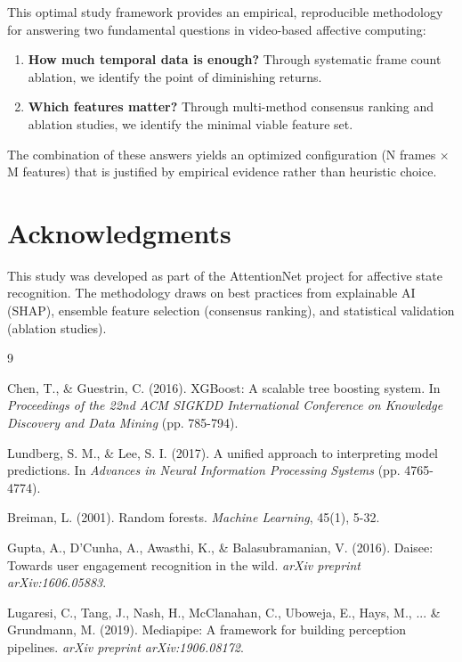 \documentclass[11pt,a4paper]{article}
\begin{document}
This optimal study framework provides an empirical, reproducible methodology for answering two fundamental questions in video-based affective computing:

\begin{enumerate}
    \item \textbf{How much temporal data is enough?} Through systematic frame count ablation, we identify the point of diminishing returns.
    
    \item \textbf{Which features matter?} Through multi-method consensus ranking and ablation studies, we identify the minimal viable feature set.
\end{enumerate}

The combination of these answers yields an optimized configuration (N frames $\times$ M features) that is justified by empirical evidence rather than heuristic choice.

\section*{Acknowledgments}

This study was developed as part of the AttentionNet project for affective state recognition. The methodology draws on best practices from explainable AI (SHAP), ensemble feature selection (consensus ranking), and statistical validation (ablation studies).

\begin{thebibliography}{9}

Chen, T., \& Guestrin, C. (2016). XGBoost: A scalable tree boosting system. In \textit{Proceedings of the 22nd ACM SIGKDD International Conference on Knowledge Discovery and Data Mining} (pp. 785-794).

Lundberg, S. M., \& Lee, S. I. (2017). A unified approach to interpreting model predictions. In \textit{Advances in Neural Information Processing Systems} (pp. 4765-4774).

Breiman, L. (2001). Random forests. \textit{Machine Learning}, 45(1), 5-32.

Gupta, A., D'Cunha, A., Awasthi, K., \& Balasubramanian, V. (2016). Daisee: Towards user engagement recognition in the wild. \textit{arXiv preprint arXiv:1606.05883}.

Lugaresi, C., Tang, J., Nash, H., McClanahan, C., Uboweja, E., Hays, M., ... \& Grundmann, M. (2019). Mediapipe: A framework for building perception pipelines. \textit{arXiv preprint arXiv:1906.08172}.

\end{thebibliography}
\end{document}
